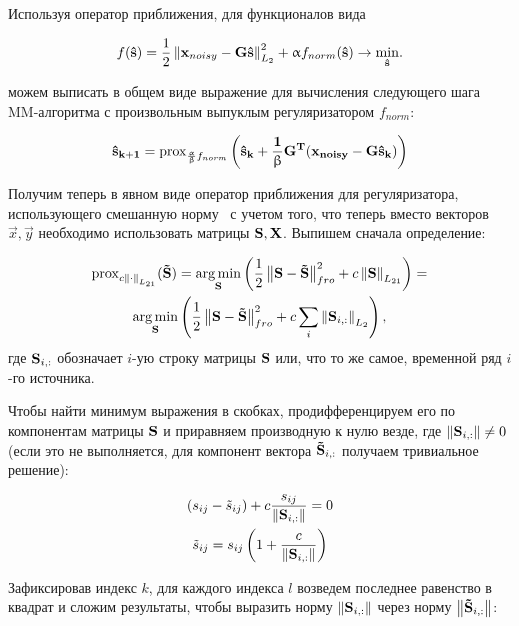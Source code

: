 Используя оператор приближения, для функционалов вида

\begin{equation}
    f(\mathbf{\hat{s}}) = \frac{1}{2}\left\lVert\mathbf{x}_{noisy} - \mathbf{G}\mathbf{\hat{s}}\right\rVert^2_{L_2} + \upalpha f_{norm}(\mathbf{\hat{s}})
    \rightarrow \underset{\mathbf{\hat{s}}}{\min}.
    \label{eq:abstract_reg_func_crit}
\end{equation}

можем выписать в общем виде выражение для вычисления следующего шага
MM-алгоритма с произвольным выпуклым регуляризатором $f_{norm}$:

\begin{equation}
    \mathbf{\hat{s}_{k+1}} =
    \operatorname{prox}_{\frac{\upalpha}{\upbeta} f_{norm}}\left(\mathbf{\hat{s}_k + \frac{1}{\upbeta} G^T(x_{noisy} - G \hat{s}_k)}\right)
    \label{eq:mm_next_iter_prox}
\end{equation}

Получим теперь в явном виде оператор приближения для регуляризатора,
использующего смешанную норму~\cite{gramfort_2012} с учетом того, что теперь
вместо векторов $\vec{x}, \vec{y}$ необходимо использовать матрицы $\mathbf{S},
\mathbf{X}$. Выпишем сначала определение:

\begin{multline*}
    \operatorname{prox}_{c \left\lVert\cdot\right\rVert_{L_{21}}}(\mathbf{\tilde{S}}) =
    \operatorname*{arg\,min}_{\mathbf{S}}\left(\frac{1}{2}\left\lVert\mathbf{S - \tilde{S}}\right\rVert^2_{fro} + c \left\lVert\mathbf{S}\right\rVert_{L_{21}}\right)=\\
    \operatorname*{arg\,min}_{\mathbf{S}}\left(\frac{1}{2}\left\lVert\mathbf{S - \tilde{S}}\right\rVert^2_{fro} + c \sum_i \left\lVert\mathbf{S}_{i,:}\right\rVert_{L_2}\right),
\end{multline*}
где $\mathbf{S}_{i,:}$ обозначает $i$-ую строку матрицы $\mathbf{S}$ или, что то же
самое, временной ряд $i$-го источника.

Чтобы найти минимум выражения в скобках, продифференцируем его по компонентам
матрицы $\mathbf{S}$ и приравняем производную к нулю везде, где $\left\lVert\mathbf{S}_{i,:}\right\rVert \neq 0$
(если это не выполняется, для компонент вектора $\mathbf{\tilde{S}}_{i,:}$ получаем тривиальное решение):

\begin{gather}
    (s_{ij} - \tilde{s}_{ij}) + c \frac{s_{ij}}{\left\lVert\mathbf{S}_{i,:}\right\rVert} = 0\\
    \tilde{s}_{ij} = s_{ij} \left(1 + \frac{c}{\left\lVert\mathbf{S}_{i,:}\right\rVert}\right)
    \label{eq:intermediate_prox_l21}
\end{gather}

Зафиксировав индекс $k$, для каждого индекса $l$ возведем последнее равенство
в квадрат и сложим результаты, чтобы выразить норму $\left\lVert\mathbf{S}_{i,:}\right\rVert$ через норму
$\left\lVert\mathbf{\tilde{S}}_{i,:}\right\rVert$:

